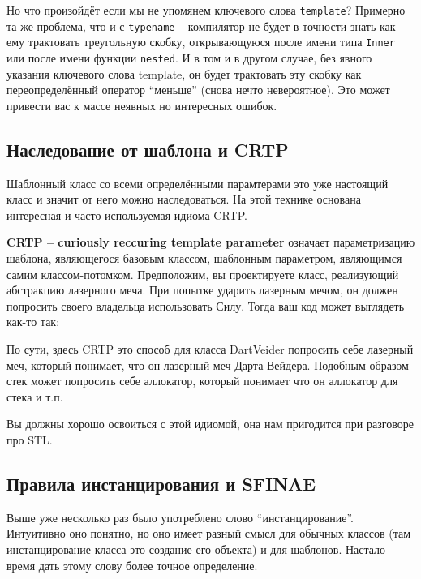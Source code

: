 \documentclass[a4paper,12pt,oneside]{article}
\begin{document}


Но что произойдёт если мы не упомянем ключевого слова \lstinline!template!? Примерно та же проблема, что и с \lstinline!typename! -- компилятор не будет в точности знать как ему трактовать треугольную скобку, открывающуюся после имени типа \lstinline!Inner! или после имени функции \lstinline!nested!. И в том и в другом случае, без явного указания ключевого слова template, он будет трактовать эту скобку как переопределённый оператор ``меньше'' (снова нечто невероятное). Это может привести вас к массе неявных но интересных ошибок.

\subsection{Наследование от шаблона и CRTP}

Шаблонный класс со всеми определёнными парамтерами это уже настоящий класс и значит от него можно наследоваться. На этой технике основана интересная и часто используемая идиома CRTP.

\textbf{CRTP – curiously reccuring template parameter} означает параметризацию шаблона, являющегося базовым классом, шаблонным параметром, являющимся самим классом-потомком. Предположим, вы проектируете класс, реализующий абстракцию лазерного меча. При попытке ударить лазерным мечом, он должен попросить своего владельца использовать Силу. Тогда ваш код может выглядеть как-то так:



По сути, здесь CRTP это способ для класса DartVeider попросить себе лазерный меч, который понимает, что он лазерный меч Дарта Вейдера. Подобным образом стек может попросить себе аллокатор, который понимает что он аллокатор для стека и т.п.

Вы должны хорошо освоиться с этой идиомой, она нам пригодится при разговоре про STL.

\subsection{Правила инстанцирования и SFINAE}

Выше уже несколько раз было употреблено слово ``инстанцирование''. Интуитивно оно понятно, но оно имеет разный смысл для обычных классов (там инстанцирование класса это создание его объекта) и для шаблонов. Настало время дать этому слову более точное определение.
\end{document}
